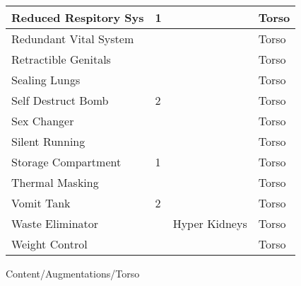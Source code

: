 \documentclass[twoside]{book}
\begin{document}
\begin{longtable}{p{1.25in}p{2em}ll}
  \raggedright
           Reduced Respitory Sys 
  &
   1 
  &
  
  &
   Torso 
  \tabularnewline
  \hline
      
  \raggedright
           Redundant Vital System 
  &
  
  &
  
  &
   Torso 
  \tabularnewline
  \hline
      
  \raggedright
           Retractible Genitals 
  &
  
  &
  
  &
   Torso 
  \tabularnewline
  \hline
      
  \raggedright
           Sealing Lungs 
  &
  
  &
  
  &
   Torso 
  \tabularnewline
  \hline
      
  \raggedright
           Self Destruct Bomb 
  &
   2 
  &
  
  &
   Torso 
  \tabularnewline
  \hline
      
  \raggedright
           Sex Changer 
  &
  
  &
  
  &
   Torso 
  \tabularnewline
  \hline
      
  \raggedright
           Silent Running 
  &
  
  &
  
  &
   Torso 
  \tabularnewline
  \hline
      
  \raggedright
           Storage Compartment 
  &
   1 
  &
  
  &
   Torso 
  \tabularnewline
  \hline
      
  \raggedright
           Thermal Masking 
  &
  
  &
  
  &
   Torso 
  \tabularnewline
  \hline
      
  \raggedright
           Vomit Tank 
  &
   2 
  &
  
  &
   Torso 
  \tabularnewline
  \hline
      
  \raggedright
           Waste Eliminator 
  &
  
  &
   Hyper Kidneys 
  &
   Torso 
  \tabularnewline
  \hline
      
  \raggedright
           Weight Control 
  &
  
  &
  
  &
   Torso 
  \tabularnewline
  \hline
      
\end{longtable}
    Content/Augmentations/Torso
\hspace{-2ex}
\end{document}
